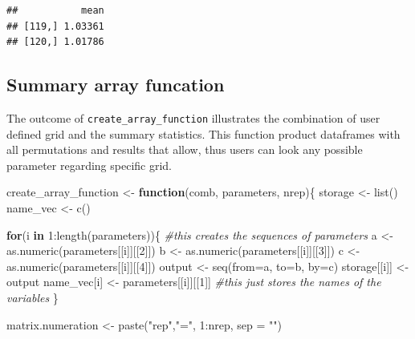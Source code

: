 \documentclass[11pt,a4paper]{article}
\newenvironment{Shaded}{\begin{snugshade}}{\end{snugshade}}
\newcommand{\AttributeTok}[1]{\textcolor[rgb]{0.77,0.63,0.00}{#1}}
\newcommand{\CommentTok}[1]{\textcolor[rgb]{0.56,0.35,0.01}{\textit{#1}}}
\newcommand{\ControlFlowTok}[1]{\textcolor[rgb]{0.13,0.29,0.53}{\textbf{#1}}}
\newcommand{\DecValTok}[1]{\textcolor[rgb]{0.00,0.00,0.81}{#1}}
\newcommand{\FunctionTok}[1]{\textcolor[rgb]{0.00,0.00,0.00}{#1}}
\newcommand{\NormalTok}[1]{#1}
\newcommand{\OtherTok}[1]{\textcolor[rgb]{0.56,0.35,0.01}{#1}}
\newcommand{\SpecialCharTok}[1]{\textcolor[rgb]{0.00,0.00,0.00}{#1}}
\newcommand{\StringTok}[1]{\textcolor[rgb]{0.31,0.60,0.02}{#1}}
\begin{document}
\begin{verbatim}
##           mean
## [119,] 1.03361
## [120,] 1.01786
\end{verbatim}

\hypertarget{summary-array-funcation}{%
\subsection{Summary array funcation}\label{summary-array-funcation}}

The outcome of \texttt{create\_array\_function} illustrates the
combination of user defined grid and the summary statistics. This
function product dataframes with all permutations and results that
allow, thus users can look any possible parameter regarding specific
grid.

\begin{Shaded}
\begin{Highlighting}[]
\NormalTok{create\_array\_function }\OtherTok{\textless{}{-}} \ControlFlowTok{function}\NormalTok{(comb, parameters, nrep)\{}
\NormalTok{  storage }\OtherTok{\textless{}{-}} \FunctionTok{list}\NormalTok{()}
\NormalTok{  name\_vec }\OtherTok{\textless{}{-}} \FunctionTok{c}\NormalTok{()}
  
  \ControlFlowTok{for}\NormalTok{(i }\ControlFlowTok{in} \DecValTok{1}\SpecialCharTok{:}\FunctionTok{length}\NormalTok{(parameters))\{ }
    \CommentTok{\#this creates the sequences of parameters}
\NormalTok{    a }\OtherTok{\textless{}{-}} \FunctionTok{as.numeric}\NormalTok{(parameters[[i]][[}\DecValTok{2}\NormalTok{]])}
\NormalTok{    b }\OtherTok{\textless{}{-}} \FunctionTok{as.numeric}\NormalTok{(parameters[[i]][[}\DecValTok{3}\NormalTok{]])}
\NormalTok{    c }\OtherTok{\textless{}{-}} \FunctionTok{as.numeric}\NormalTok{(parameters[[i]][[}\DecValTok{4}\NormalTok{]])}
\NormalTok{    output }\OtherTok{\textless{}{-}} \FunctionTok{seq}\NormalTok{(}\AttributeTok{from=}\NormalTok{a, }\AttributeTok{to=}\NormalTok{b, }\AttributeTok{by=}\NormalTok{c)}
\NormalTok{    storage[[i]] }\OtherTok{\textless{}{-}}\NormalTok{  output}
\NormalTok{    name\_vec[i] }\OtherTok{\textless{}{-}}\NormalTok{ parameters[[i]][[}\DecValTok{1}\NormalTok{]] }
    \CommentTok{\#this just stores the names of the variables}
\NormalTok{  \}}
  
  
\NormalTok{  matrix.numeration }\OtherTok{\textless{}{-}}  \FunctionTok{paste}\NormalTok{(}\StringTok{"rep"}\NormalTok{,}\StringTok{"="}\NormalTok{, }\DecValTok{1}\SpecialCharTok{:}\NormalTok{nrep, }\AttributeTok{sep =} \StringTok{""}\NormalTok{)}
  

\end{Highlighting}
\end{Shaded}
\end{document}
